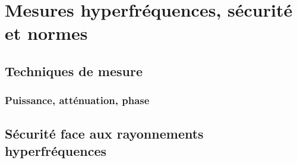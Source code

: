 \chapter{Mesures hyperfréquences, sécurité et normes} \label{sec:microwave_measurements}
\section{Techniques de mesure} \label{subsec:measurement_techniques}
\subsection{Puissance, atténuation, phase} \label{subsec:power_attenuation_phase}
\section{Sécurité face aux rayonnements hyperfréquences} \label{subsec:microwave_safety}
